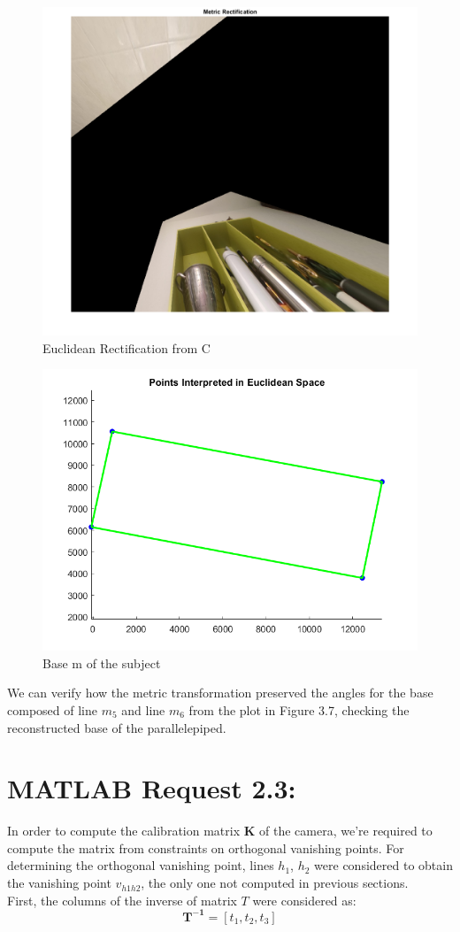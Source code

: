 \documentclass{Configuration_Files/PoliMi3i_thesis}
\begin{document}
\begin{figure}[H]
    \centering
    \includegraphics[width=0.8\linewidth]{Project Template/Images/metricrect.png}
    \caption{Euclidean Rectification from C}
    \label{fig:enter-label}
\end{figure}

\begin{figure}[H]
    \centering
    \includegraphics[width=0.5\linewidth]{Project Template/Images/basem.png}
    \caption{Base m of the subject}
    \label{fig:enter-label}
\end{figure}

We can verify how the metric transformation preserved the angles for the base composed of line \( m_5 \) and line \( m_6 \) from the plot in Figure 3.7, checking the reconstructed base of the parallelepiped.



\newpage
\section{MATLAB Request 2.3: }

In order to compute the calibration matrix \textbf{K} of the camera, we're required to compute the matrix from constraints on orthogonal vanishing points.
For determining the orthogonal vanishing point, lines $h_1$, $h_2$ were considered to obtain the vanishing point $v_{h1h2}$, the only one not computed in previous sections.
\\First, the columns of the inverse of matrix $T$ were considered as:
\[
\mathbf{T^{-1}} = [t_1, t_2, t_3]
\]
\end{document}
